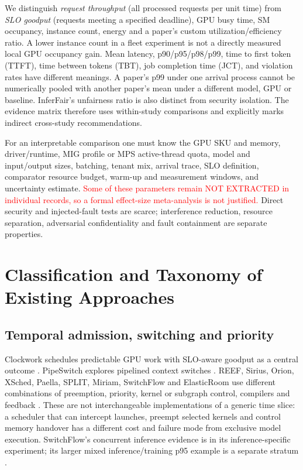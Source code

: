 \documentclass[12pt,a4paper]{article}
\newcommand{\red}[1]{\textcolor{red}{#1}}
\begin{document}
We distinguish \emph{request throughput} (all processed requests per unit time) from \emph{SLO goodput} (requests meeting a specified deadline), GPU busy time, SM occupancy, instance count, energy and a paper's custom utilization/efficiency ratio. A lower instance count in a fleet experiment is not a directly measured local GPU occupancy gain. Mean latency, p90/p95/p98/p99, time to first token (TTFT), time between tokens (TBT), job completion time (JCT), and violation rates have different meanings. A paper's p99 under one arrival process cannot be numerically pooled with another paper's mean under a different model, GPU or baseline. InferFair's unfairness ratio is also distinct from security isolation. The evidence matrix therefore uses within-study comparisons and explicitly marks indirect cross-study recommendations.

For an interpretable comparison one must know the GPU SKU and memory, driver/runtime, MIG profile or MPS active-thread quota, model and input/output sizes, batching, tenant mix, arrival trace, SLO definition, comparator resource budget, warm-up and measurement windows, and uncertainty estimate. \red{Some of these parameters remain NOT EXTRACTED in individual records, so a formal effect-size meta-analysis is not justified.} Direct security and injected-fault tests are scarce; interference reduction, resource separation, adversarial confidentiality and fault containment are separate properties.

\section{Classification and Taxonomy of Existing Approaches}
\subsection{Temporal admission, switching and priority}
Clockwork schedules predictable GPU work with SLO-aware goodput as a central outcome \cite{clockwork}. PipeSwitch explores pipelined context switches \cite{pipeswitch}. REEF, Sirius, Orion, XSched, Paella, SPLIT, Miriam, SwitchFlow and ElasticRoom use different combinations of preemption, priority, kernel or subgraph control, compilers and feedback \cite{reef,sirius,orion,xsched,paella,split,miriam,switchflow,elasticroom}. These are not interchangeable implementations of a generic time slice: a scheduler that can intercept launches, preempt selected kernels and control memory handover has a different cost and failure mode from exclusive model execution. SwitchFlow's concurrent inference evidence is in its inference-specific experiment; its larger mixed inference/training p95 example is a separate stratum \cite{switchflow}.
\end{document}
